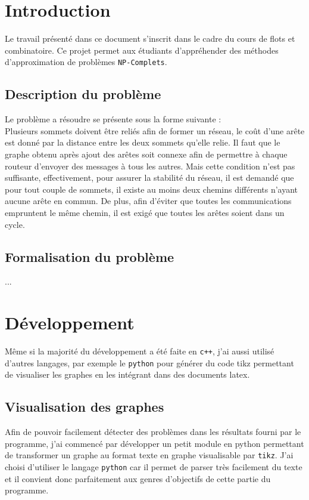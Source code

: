 \documentclass[a4paper,12pt]{article}
\begin{document}
\tableofcontents
\pagebreak

\section{Introduction}
Le travail présenté dans ce document s'inscrit dans le cadre du cours de
flots et combinatoire. Ce projet permet aux étudiants d'appréhender des
méthodes d'approximation de problèmes \verb!NP-Complets!.\\

\subsection{Description du problème}
Le problème a résoudre se présente sous la forme suivante :\\
Plusieurs sommets doivent être reliés afin de former un réseau, le coût d'une
arête est donné par la distance entre les deux sommets qu'elle relie. Il faut
que le graphe obtenu après ajout des arêtes soit connexe afin de permettre
à chaque routeur d'envoyer des messages à tous les autres. Mais cette
condition n'est pas suffisante, effectivement, pour assurer la stabilité du
réseau, il est demandé que pour tout couple de sommets, il existe au moins
deux chemins différents n'ayant aucune arête en commun. De plus, afin
d'éviter que toutes les communications empruntent le même chemin, il est
exigé que toutes les arêtes soient dans un cycle.

\subsection{Formalisation du problème}
...

\section{Développement}

Même si la majorité du développement a été faite en \verb!c++!, j'ai aussi
utilisé d'autres langages, par exemple le \verb!python! pour générer du code
tikz permettant de visualiser les graphes en les intégrant dans des documents
latex.

\subsection{Visualisation des graphes}
Afin de pouvoir facilement détecter des problèmes dans les résultats fourni
par le programme, j'ai commencé par développer un petit module en python
permettant de transformer un graphe au format texte en graphe visualisable
par \verb!tikz!.
J'ai choisi d'utiliser le langage \verb!python! car il permet de parser très
facilement du texte et il convient donc parfaitement aux genres d'objectifs
de cette partie du programme.
\end{document}
